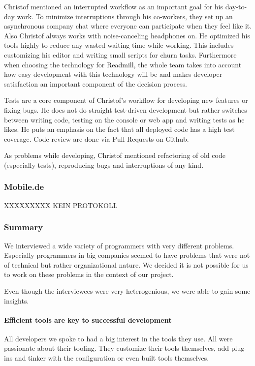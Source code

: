 Christof mentioned an interrupted workflow as an important goal for his day-to-day work. To minimize interruptions through his co-workers, they set up an asynchronous company chat where everyone can participate when they feel like it. Also Christof always works with noise-canceling headphones on. He optimized his tools highly to reduce any wasted waiting time while working. This includes customizing his editor and writing small scripts for churn tasks. Furthermore when choosing the technology for Readmill, the whole team takes into account how easy development with this technology will be and makes developer satisfaction an important component of the decision process.

Tests are a core component of Christof's workflow for developing new features or fixing bugs. He does not do straight test-driven development but rather switches between writing code, testing on the console or web app and writing tests as he likes. He puts an emphasis on the fact that all deployed code has a high test coverage. Code review are done via Pull Requests on Github.

As problems while developing, Christof mentioned refactoring of old code (especially tests), reproducing bugs and interruptions of any kind.

\subsubsection{Mobile.de}

XXXXXXXXX KEIN PROTOKOLL

\subsubsection{Summary} We interviewed a wide variety of programmers with very different problems. Especially programmers in big companies seemed to have problems that were not of technical but rather organizational nature. We decided it is not possible for us to work on these problems in the context of our project.

Even though the interviewees were very heterogenious, we were able to gain some insights.

\paragraph{Efficient tools are key to successful development} All developers we spoke to had a big interest in the tools they use. All were passionate about their tooling. They customize their tools themselves, add plug-ins and tinker with the configuration or even built tools themselves.

